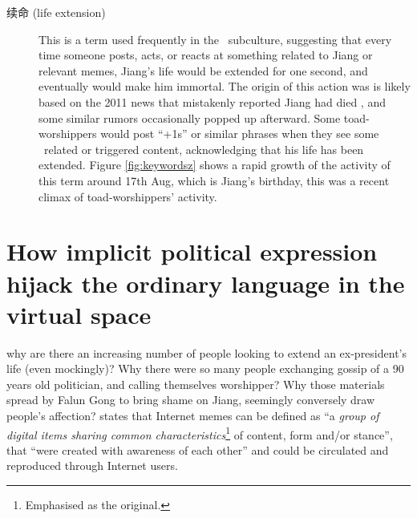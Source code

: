 \begin{description}
\begin{marginfigure}
		\label{fig:keywordsz}
	\end{marginfigure}
	\item[续命 (life extension)] This is a term used frequently in the \moha\ subculture, suggesting that every time someone posts, acts, or reacts at something related to Jiang or relevant memes, Jiang's life would be extended for one second, and eventually would make him immortal. The origin of this action was is likely based on the 2011 news that mistakenly reported Jiang had died \citep{blanchard_china_2011,bbc_hong_2011}, and some similar rumors occasionally popped up afterward. Some toad-worshippers would post ``+1s'' or similar phrases when they see some \moha\ related or triggered content, acknowledging that his life has been extended. Figure \vref{fig:keywordsz} shows a rapid growth of the activity of this term around 17th Aug, which is Jiang's birthday, this was a recent climax of toad-worshippers' activity.
\end{description}

\section{How implicit political expression hijack the ordinary language in the virtual space}
why are there an increasing number of people looking to extend an ex-president's life (even mockingly)? Why there were so many people exchanging gossip of a 90 years old politician, and calling themselves worshipper? Why those materials spread by Falun Gong to bring shame on Jiang, seemingly conversely draw people's affection? \citet[pp.~7--8]{shifman_introduction_2014} states that Internet memes can be defined as ``a \textit{group of digital items sharing common characteristics}\footnote{Emphasised as the original.} of content, form and/or stance'', that ``were created with awareness of each other'' and could be circulated and reproduced through Internet users.

